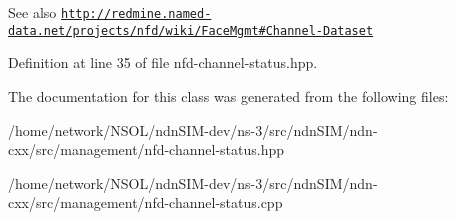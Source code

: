 \begin{DoxySeeAlso}{See also}
\href{http://redmine.named-data.net/projects/nfd/wiki/FaceMgmt#Channel-Dataset}{\tt http\+://redmine.\+named-\/data.\+net/projects/nfd/wiki/\+Face\+Mgmt\#\+Channel-\/\+Dataset} 
\end{DoxySeeAlso}


Definition at line 35 of file nfd-\/channel-\/status.\+hpp.



The documentation for this class was generated from the following files\+:\begin{DoxyCompactItemize}
\item 
/home/network/\+N\+S\+O\+L/ndn\+S\+I\+M-\/dev/ns-\/3/src/ndn\+S\+I\+M/ndn-\/cxx/src/management/nfd-\/channel-\/status.\+hpp\item 
/home/network/\+N\+S\+O\+L/ndn\+S\+I\+M-\/dev/ns-\/3/src/ndn\+S\+I\+M/ndn-\/cxx/src/management/nfd-\/channel-\/status.\+cpp\end{DoxyCompactItemize}
